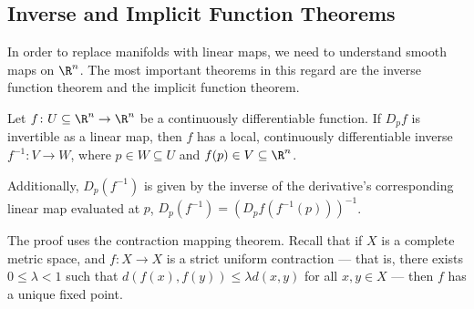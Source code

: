 \documentclass[10pt]{mypackage}
\begin{document}
\subsection{Inverse and Implicit Function Theorems}%
In order to replace manifolds with linear maps, we need to understand smooth maps on $\R^n$. The most important theorems in this regard are the inverse function theorem and the implicit function theorem.
\begin{theorem}
  Let $f\colon U\subseteq \R^n \rightarrow \R^n$ be a continuously differentiable function. If $D_{p}f$ is invertible as a linear map, then $f$ has a local, continuously differentiable inverse $f^{-1}\colon V\rightarrow W$, where $p\in W\subseteq U$ and $f(p)\in V\subseteq \R^n$.\newline

  Additionally, $D_p\left( f^{-1} \right) $ is given by the inverse of the derivative's corresponding linear map evaluated at $p$, $ D_p\left( f^{-1} \right) = \left( D_pf\left( f^{-1}(p) \right) \right)^{-1}$.
\end{theorem}
The proof uses the contraction mapping theorem. Recall that if $X$ is a complete metric space, and $f\colon X\rightarrow X$ is a strict uniform contraction --- that is, there exists $0\leq \lambda < 1$ such that $d\left( f(x),f(y) \right) \leq \lambda d\left( x,y \right)$ for all $x,y\in X$ --- then $f$ has a unique fixed point.\newline
\end{document}
